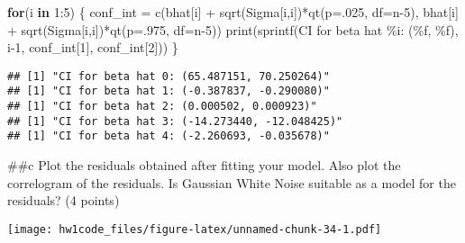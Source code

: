 \documentclass[
]{article}
\newenvironment{Shaded}{\begin{snugshade}}{\end{snugshade}}
\newcommand{\AttributeTok}[1]{\textcolor[rgb]{0.77,0.63,0.00}{#1}}
\newcommand{\ControlFlowTok}[1]{\textcolor[rgb]{0.13,0.29,0.53}{\textbf{#1}}}
\newcommand{\DecValTok}[1]{\textcolor[rgb]{0.00,0.00,0.81}{#1}}
\newcommand{\FunctionTok}[1]{\textcolor[rgb]{0.00,0.00,0.00}{#1}}
\newcommand{\NormalTok}[1]{#1}
\newcommand{\OtherTok}[1]{\textcolor[rgb]{0.56,0.35,0.01}{#1}}
\newcommand{\SpecialCharTok}[1]{\textcolor[rgb]{0.00,0.00,0.00}{#1}}
\newcommand{\StringTok}[1]{\textcolor[rgb]{0.31,0.60,0.02}{#1}}
\begin{document}
\begin{Shaded}
\begin{Highlighting}[]
\ControlFlowTok{for}\NormalTok{(i }\ControlFlowTok{in} \DecValTok{1}\SpecialCharTok{:}\DecValTok{5}\NormalTok{) \{}
\NormalTok{  conf\_int }\OtherTok{=} \FunctionTok{c}\NormalTok{(bhat[i] }\SpecialCharTok{+} \FunctionTok{sqrt}\NormalTok{(Sigma[i,i])}\SpecialCharTok{*}\FunctionTok{qt}\NormalTok{(}\AttributeTok{p=}\NormalTok{.}\DecValTok{025}\NormalTok{, }\AttributeTok{df=}\NormalTok{n}\DecValTok{{-}5}\NormalTok{), bhat[i] }\SpecialCharTok{+} \FunctionTok{sqrt}\NormalTok{(Sigma[i,i])}\SpecialCharTok{*}\FunctionTok{qt}\NormalTok{(}\AttributeTok{p=}\NormalTok{.}\DecValTok{975}\NormalTok{, }\AttributeTok{df=}\NormalTok{n}\DecValTok{{-}5}\NormalTok{))}
  \FunctionTok{print}\NormalTok{(}\FunctionTok{sprintf}\NormalTok{(}\StringTok{\textquotesingle{}CI for beta hat \%i: (\%f, \%f)\textquotesingle{}}\NormalTok{, i}\DecValTok{{-}1}\NormalTok{, conf\_int[}\DecValTok{1}\NormalTok{], conf\_int[}\DecValTok{2}\NormalTok{]))}
\NormalTok{\}}
\end{Highlighting}
\end{Shaded}

\begin{verbatim}
## [1] "CI for beta hat 0: (65.487151, 70.250264)"
## [1] "CI for beta hat 1: (-0.387837, -0.290080)"
## [1] "CI for beta hat 2: (0.000502, 0.000923)"
## [1] "CI for beta hat 3: (-14.273440, -12.048425)"
## [1] "CI for beta hat 4: (-2.260693, -0.035678)"
\end{verbatim}

\#\#c Plot the residuals obtained after fitting your model. Also plot
the correlogram of the residuals. Is Gaussian White Noise suitable as a
model for the residuals? (4 points)

\begin{Shaded}
\end{Shaded}

\texttt{[image: hw1code\_files/figure-latex/unnamed-chunk-34-1.pdf]}

\begin{Shaded}
\end{Shaded}
\end{document}
